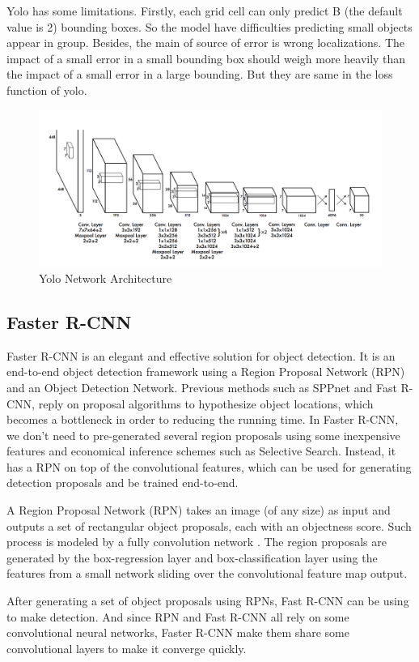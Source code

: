 Yolo has some limitations. Firstly, each grid cell can only predict B (the default value is 2) bounding boxes. So the model have difficulties predicting small objects appear in group. Besides, the main of source of error is wrong localizations. The impact of a small error in a small bounding box should weigh more heavily than the impact of a small error in a large bounding. But they are same in the loss function of yolo. 
\begin{figure}[H]
    \centering
    \includegraphics[width=1.0\linewidth]{img/yolo_network.png}
    \caption{Yolo Network Architecture}
\end{figure}%


\subsection{Faster R-CNN}
Faster R-CNN is an elegant and effective solution for object detection. 
It is an end-to-end object detection framework using a Region Proposal Network (RPN) and an Object Detection Network. Previous methods such as SPPnet and Fast R-CNN, reply on proposal algorithms to hypothesize object locations, which becomes a bottleneck in order to reducing the running time. In Faster R-CNN, we don't need to pre-generated several region proposals using some inexpensive features and economical inference schemes such as Selective Search. Instead, it has a RPN on top of the convolutional features, which can be used for generating detection proposals and be trained end-to-end. 

A Region Proposal Network (RPN) takes an image (of any size) as input and outputs a set of rectangular object proposals, each with an objectness score. Such process is modeled by a fully convolution network \cite{long2015fully}. The region proposals are generated by 
the box-regression layer and box-classification layer using the features from a small network sliding over the convolutional feature map output. 

After generating a set of object proposals using RPNs, Fast R-CNN can be using to make detection. And since RPN and Fast R-CNN all rely on some convolutional neural networks, Faster R-CNN make them share some convolutional layers to make it converge quickly.
